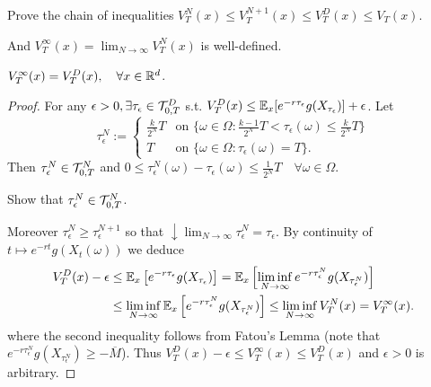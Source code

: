 \begin{homework}
    Prove the chain of inequalities $V_T^N(x) \leq V_T^{N+1}(x) \leq V_T^D(x) \leq V_T(x)$.
\end{homework}

And $V_T^\infty(x) = \lim_{N \to \infty} V_T^N(x)$ is well-defined.

\begin{lemma}
    $V_T^\infty(x) = V_T^D(x), \quad \forall x \in \mathbb R^d$.
\end{lemma}

\begin{proof}
    For any $\epsilon > 0, \exists \tau_\epsilon \in \mathcal{T}_{0,T}^D$ s.t. $V_T^D(x) \leq \mathbb E_x [e^{-r\tau_\epsilon} g(X_{\tau_\epsilon})] + \epsilon$.
    Let
    \begin{equation*}
        \tau_\epsilon^N := \begin{cases} \frac{k}{2^N}T & \text{on } \{ \omega \in \Omega : \frac{k-1}{2^N}T < \tau_\epsilon(\omega) \leq \frac{k}{2^N}T \} \\ T & \text{on } \{ \omega \in \Omega : \tau_\epsilon(\omega) = T \}. \end{cases}
    \end{equation*}
    Then $\tau_\epsilon^N \in \mathcal{T}_{0,T}^N$ and $0 \leq \tau_\epsilon^N(\omega) - \tau_\epsilon(\omega) \leq \frac{1}{2^N} T \quad \forall \omega \in \Omega$.
    
    \begin{homework}
        Show that $\tau_\epsilon^N \in \mathcal{T}_{0,T}^N$.
    \end{homework}
    
    Moreover $\tau_\epsilon^N \geq \tau_\epsilon^{N+1}$ so that $\downarrow \lim_{N \to \infty} \tau_\epsilon^N = \tau_\epsilon$.
    By continuity of $t \mapsto e^{-rt} g(X_t(\omega))$ we deduce
    \begin{align*}
        V_T^D(x) - \epsilon &\leq \mathbb E_x \left[ e^{-r\tau_\epsilon} g(X_{\tau_\epsilon}) \right] = \mathbb E_x \left[ \liminf_{N \to \infty} e^{-r\tau_\epsilon^N} g(X_{\tau_\epsilon^N}) \right] \\
        &\leq \liminf_{N \to \infty} \mathbb E_x \left[ e^{-r\tau_\epsilon^N} g(X_{\tau_\epsilon^N}) \right] \leq \liminf_{N \to \infty} V_T^N(x) = V_T^\infty(x).
    \end{align*}
    where the second inequality follows from Fatou's Lemma (note that $e^{-r\tau_\epsilon^N} g(X_{\tau_\epsilon^N}) \geq -\overline{M}$).
    Thus $V_T^D(x) - \epsilon \leq V_T^\infty(x) \leq V_T^D(x)$ and $\epsilon > 0$ is arbitrary.
\end{proof}

